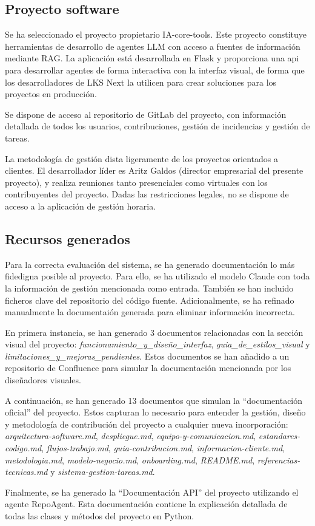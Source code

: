 \subsection{Proyecto software}
Se ha seleccionado el proyecto propietario IA-core-tools. Este proyecto constituye herramientas de desarrollo de agentes LLM con acceso a fuentes de información mediante RAG. La aplicación está desarrollada en Flask y proporciona una api para desarrollar agentes de forma interactiva con la interfaz visual, de forma que los desarrolladores de LKS Next la utilicen para crear soluciones para los proyectos en producción.

Se dispone de acceso al repositorio de GitLab del proyecto, con información detallada de todos los usuarios, contribuciones, gestión de incidencias y gestión de tareas.

La metodología de gestión dista ligeramente de los proyectos orientados a clientes. El desarrollador líder es Aritz Galdos (director empresarial del presente proyecto), y realiza reuniones tanto presenciales como virtuales con los contribuyentes del proyecto. Dadas las restricciones legales, no se dispone de acceso a la aplicación de gestión horaria.

\subsection{Recursos generados}

Para la correcta evaluación del sistema, se ha generado documentación lo más fidedigna posible al proyecto. Para ello, se ha utilizado el modelo Claude con toda la información de gestión mencionada como entrada. También se han incluido ficheros clave del repositorio del código fuente. Adicionalmente, se ha refinado manualmente la documentaión generada para eliminar información incorrecta.

En primera instancia, se han generado 3 documentos relacionadas con la sección visual del proyecto: \textit{funcionamiento\_y\_diseño\_interfaz}, \textit{guia\_de\_estilos\_visual} y \textit{limitaciones\_y\_mejoras\_pendientes}. Estos documentos se han añadido a un repositorio de Confluence para simular la documentación mencionada por los diseñadores visuales. 

A continuación, se han generado 13 documentos que simulan la ``documentación oficial'' del proyecto. Estos capturan lo necesario para entender la gestión, diseño y metodología de contribución del proyecto a cualquier nueva incorporación: \textit{arquitectura-software.md}, \textit{despliegue.md}, \textit{equipo-y-comunicacion.md}, \textit{estandares-codigo.md}, \textit{flujos-trabajo.md}, \textit{guia-contribucion.md}, \textit{informacion-cliente.md}, \textit{metodologia.md}, \textit{modelo-negocio.md}, \textit{onboarding.md}, \textit{README.md}, \textit{referencias-tecnicas.md} y \textit{sistema-gestion-tareas.md}.

Finalmente, se ha generado la ``Documentación API'' del proyecto utilizando el agente RepoAgent\cite{luo_repoagent_2024}. Esta documentación contiene la explicación detallada de todas las clases y métodos del proyecto en Python.










